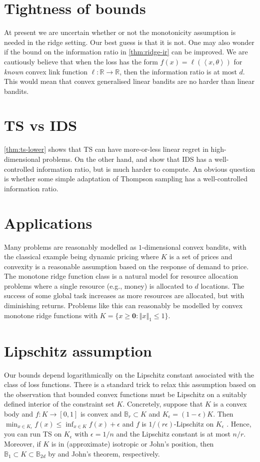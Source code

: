\documentclass[letter, 12pt]{report}
\newcommand{\R}{\mathbb R}
\newcommand{\ip}[1]{\left \langle #1 \right \rangle}
\newcommand{\ball}{\mathbb{B}}
\newcommand{\norm}[1]{\left \Vert  #1 \right \Vert}
\newcommand{\zeros}{ \bm 0}
\newcommand{\1}{\mathbf{1}}
\newcommand{\ts}{\textsc{TS}\xspace}
\newcommand{\IDS}{\textsc{IDS}}
\theoremstyle{plain}
\theoremstyle{definition}
\theoremstyle{remark}
\begin{document}
\section{Tightness of bounds} At present we are uncertain whether or not the monotonicity assumption is needed in the ridge setting. Our best guess is that it is not.
One may also wonder if the bound on the information ratio in \cref{thm:ridge-ir} can be improved. We are cautiously believe
that when the loss has the form $f(x) = \ell(\ip{x, \theta})$ for \textit{known} convex link function $\ell : \R \to \R$, then the information ratio is at most $d$.
This would mean that convex generalised linear bandits are no harder than linear bandits.

\section{\ts{} vs \IDS} \cref{thm:ts-lower} shows that \ts{} can have more-or-less linear regret in high-dimensional problems. On the other hand,
\cite{BE18} and \cite{Lat20-cvx} show that \IDS{} has a well-controlled information ratio, but is much harder to compute.
An obvious question is whether some simple adaptation of Thompson sampling has a well-controlled information ratio.
\section{Applications} Many problems are reasonably modelled as $1$-dimensional convex bandits, with the classical example being dynamic pricing
where $K$ is a set of prices and convexity is a reasonable assumption based on the response of demand to price.
The monotone ridge function class is a natural model for resource allocation problems where a single resource (e.g., money) is allocated to $d$ locations.
The success of some global task increases as more resources are allocated, but with diminishing returns. Problems like this can reasonably be modelled
by convex monotone ridge functions with $K = \{x \geq \zeros : \norm{x}_1 \leq 1\}$.
\section{Lipschitz assumption} Our bounds depend logarithmically on the Lipschitz constant associated with the class of loss functions.
There is a standard trick to relax this assumption based on the observation that bounded convex functions must be Lipschitz on a suitably defined
interior of the constraint set $K$.
Concretely, suppose that $K$ is a convex body and $f : K \to [0,1]$ is convex and $\ball_r \subset K$ and $K_\epsilon = (1 - \epsilon) K$.
Then $\min_{x \in K_\epsilon} f(x) \leq \inf_{x \in K} f(x) + \epsilon$ and $f$ is $1/(r\epsilon)$-Lipschitz on $K_\epsilon$ \citep[Chapter 3]{lat24book}.
Hence, you can run \ts{} on $K_\epsilon$ with $\epsilon = 1/n$ and the Lipschitz constant is at most $n/r$.
Moreover, if $K$ is in (approximate) isotropic or John's position, then $\ball_1 \subset K \subset \ball_{2d}$ by \cite{kannan1995isoperimetric}
and John's theorem, respectively.
\end{document}

